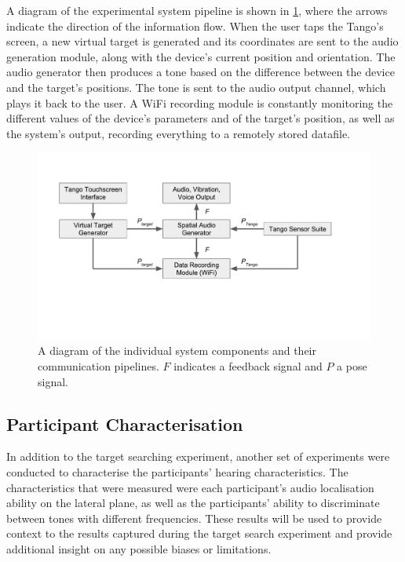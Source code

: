 \documentclass{article}
\begin{document}
A diagram of the experimental system pipeline is shown in \cref{fig:pipeline}, where the arrows indicate the direction of the information flow.
When the user taps the Tango's screen, a new virtual target is generated and its coordinates are sent to the audio generation module, along with the device's current position and orientation.
The audio generator then produces a tone based on the difference between the device and the target's positions. The tone is sent to the audio output channel, which plays it back to the user.
A WiFi recording module is constantly monitoring the different values of the device's parameters and of the target's position, as well as the system's output, recording everything to a remotely stored datafile. 

\begin{figure}[t]
  \centering
  \includegraphics[clip=true, trim=0 120 80 50, width=0.9\columnwidth]{figures/pipeline.pdf}
  \caption{A diagram of the individual system components and their communication pipelines. $F$ indicates a feedback signal and $P$ a pose signal. }\label{fig:pipeline}
\end{figure}

\subsection{Participant Characterisation}

In addition to the target searching experiment, another set of experiments were conducted to characterise the participants' hearing characteristics.
The characteristics that were measured were each participant's audio localisation ability on the lateral plane, as well as the participants' ability to discriminate between tones with different frequencies. 
These results will be used to provide context to the results captured during the target search experiment and provide additional insight on any possible biases or limitations. 
\end{document}
